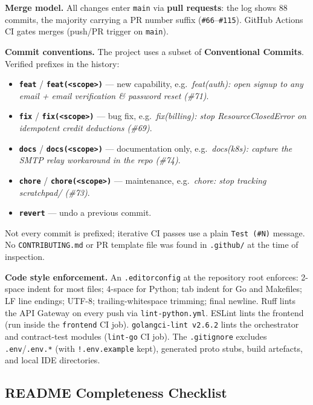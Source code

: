 \documentclass[12pt,a4paper]{article}
\begin{document}
\textbf{Merge model.}
All changes enter \texttt{main} via \textbf{pull requests}: the log shows
88 commits, the majority carrying a PR number suffix
(\texttt{\#66}--\texttt{\#115}). GitHub Actions CI gates merges
(push/PR trigger on \texttt{main}).

\textbf{Commit conventions.}
The project uses a subset of \textbf{Conventional Commits}. Verified
prefixes in the history:

\begin{itemize}[leftmargin=1.5em]
  \item \textbf{\texttt{feat}} / \textbf{\texttt{feat(<scope>)}} ---
        new capability, e.g.\
        \textit{feat(auth): open signup to any email + email verification \&
        password reset (\#71)}.
  \item \textbf{\texttt{fix}} / \textbf{\texttt{fix(<scope>)}} ---
        bug fix, e.g.\
        \textit{fix(billing): stop ResourceClosedError on idempotent credit
        deductions (\#69)}.
  \item \textbf{\texttt{docs}} / \textbf{\texttt{docs(<scope>)}} ---
        documentation only, e.g.\
        \textit{docs(k8s): capture the SMTP relay workaround in the repo (\#74)}.
  \item \textbf{\texttt{chore}} / \textbf{\texttt{chore(<scope>)}} ---
        maintenance, e.g.\
        \textit{chore: stop tracking scratchpad/ (\#73)}.
  \item \textbf{\texttt{revert}} --- undo a previous commit.
\end{itemize}

Not every commit is prefixed; iterative CI passes use a plain
\texttt{Test (\#N)} message. No \texttt{CONTRIBUTING.md} or PR template
file was found in \texttt{.github/} at the time of inspection.

\textbf{Code style enforcement.}
An \texttt{.editorconfig} at the repository root enforces: 2-space indent
for most files; 4-space for Python; tab indent for Go and Makefiles;
LF line endings; UTF-8; trailing-whitespace trimming; final newline.
Ruff lints the API Gateway on every push via \texttt{lint-python.yml}.
ESLint lints the frontend (run inside the \texttt{frontend} CI job).
\texttt{golangci-lint v2.6.2} lints the orchestrator and contract-test
modules (\texttt{lint-go} CI job). The \texttt{.gitignore} excludes
\texttt{.env}/\texttt{.env.*} (with \texttt{!.env.example} kept),
generated proto stubs, build artefacts, and local IDE directories.

\subsection{README Completeness Checklist}
\end{document}

